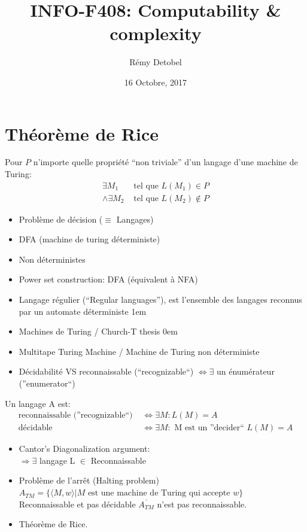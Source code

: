 \documentclass[a4paper,12pt]{article}
\title{INFO-F408: Computability \& complexity}
\date{16 Octobre, 2017}
\author{Rémy Detobel}
\begin{document}
\maketitle
\newpage

\section{Théorème de Rice}
  Pour $P$ n'importe quelle propriété ``non triviale'' d'un langage d'une machine de Turing:
  \begin{align*}
    \exists M_1 &\text{ tel que } L(M_1) \in P\\
    \wedge \exists M_2 &\text{ tel que } L(M_2) \notin P
  \end{align*}

  \begin{itemize}
   \item Problème de décision ($\equiv$ Langages)
   \item DFA (machine de turing déterministe)
   \item Non déterministes
   \item Power set construction: DFA (équivalent à NFA)
   \item Langage régulier (``Regular languages''), est l'ensemble des langages reconnus par un automate déterministe
   \itemsep1em
   \item Machines de Turing / Church-T thesis
   \itemsep0em
   \item Multitape Turing Machine / Machine de Turing non déterministe
   \item Décidabilité VS reconnaissable (``recognizable``) $\Leftrightarrow \exists$ un énumérateur (''enumerator``)
  \end{itemize}

  Un langage A est:
  \begin{align*}
    \text{reconnaissable (''recognizable``) } &\Leftrightarrow \exists M: L(M) = A\\
    \text{décidable } &\Leftrightarrow \exists M: \text{ M est un ''decider`` } L(M) = A
  \end{align*}

  \begin{itemize}
    \item Cantor's Diagonalization argument:\\
      $\Rightarrow \exists$ langage L $\in$ Reconnaissable
    \item Problème de l'arrêt (Halting problem)\\
      $A_{TM} = \{\langle M, w\rangle | M \text{ est une machine de Turing qui accepte } w\}$\\
      Reconnaissable et pas décidable $\overline {A_{TM}}$ n'est pas reconnaissable.
    \item Théorème de Rice.
  \end{itemize}
\end{document}
